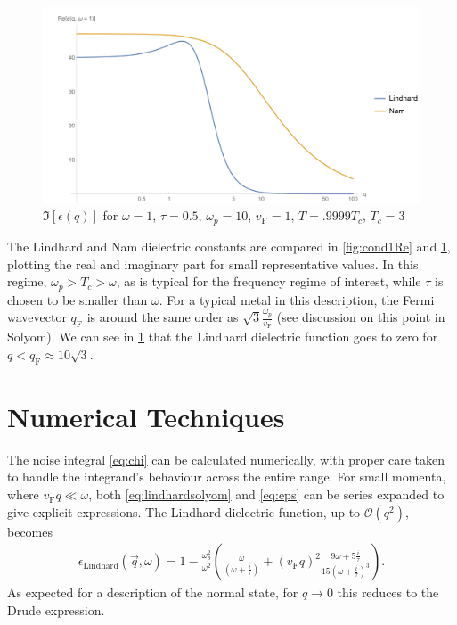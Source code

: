 \documentclass{article}
\newcommand{\vf}{v_{\mathrm{F}}}
\newcommand{\qf}{q_{\mathrm{F}}}
\begin{document}
\begin{figure}[htp]
	\centering
	\includegraphics[width=12cm]{Cond1Im}
	\caption{$\Im[\epsilon(q)]$ for $\omega = 1$, $\tau = 0.5$, $\omega_p = 10$, $\vf = 1$, $T = .9999 T_c$, $T_c = 3$} \label{fig:cond1Im}
\end{figure}

The Lindhard and Nam dielectric constants are compared in \cref{fig:cond1Re} and \cref{fig:cond1Im}, plotting the real and imaginary part for small representative values.
In this regime, $\omega_p > T_c > \omega$, as is typical for the frequency regime of interest, while $\tau$ is chosen to be smaller than $\omega$.
For a typical metal in this description, the Fermi wavevector $\qf$ is around the same order as $\sqrt{3}\frac{\omega_p}{\vf}$ (see discussion on this point in Solyom\cite{SolyomV3}).
We can see in \cref{fig:cond1Im} that the Lindhard dielectric function goes to zero for $q < \qf \approx 10 \sqrt{3}$.

\section{Numerical Techniques \label{sec:technical}}

The noise integral \eqref{eq:chi} can be calculated numerically, with proper care taken to handle the integrand's behaviour across the entire range.
For small momenta, where $\vf q \ll \omega$, both \eqref{eq:lindhardsolyom} and \eqref{eq:eps} can be series expanded to give explicit expressions.
The Lindhard dielectric function, up to $\mathcal{O}(q^2)$, becomes
\begin{gather}
	\epsilon_{\mathrm{Lindhard}}(\vec{q}, \omega) = 1 - \frac{\omega_p^2}{\omega^2} \left(\frac{\omega}{(\omega + \frac{i}{\tau})} + (\vf q)^2  \frac{9 \omega + 5 \frac{i}{\tau}}{15 (\omega + \frac{i}{\tau})^3} \right). \label{eq:lindhardsmallkseries}
\end{gather}
As expected for a description of the normal state, for $q \rightarrow 0$ this reduces to the Drude expression.
\end{document}
